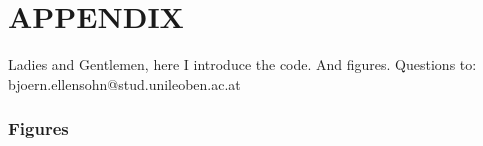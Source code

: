 \documentclass{CPSReport}
\begin{document}
\onecolumn
\section*{APPENDIX}\label{sec:appendix}

Ladies and Gentlemen, here I introduce the code. And figures.
\newline Questions to: bjoern.ellensohn@stud.unileoben.ac.at




\subsubsection*{Figures}





\thispagestyle{lastpage}
\end{document}
